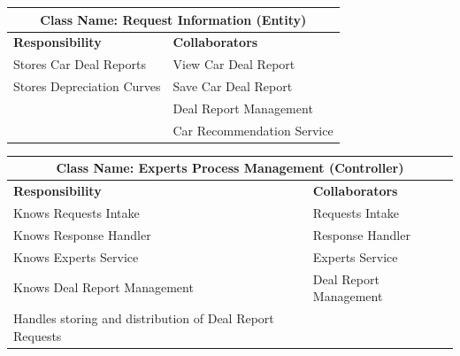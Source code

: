 \documentclass[]{article}
\begin{document}
\begin{table}[H]
  \centering
  \renewcommand{\arraystretch}{1.3} %
  \begin{tabular}{|p{7.5cm}|p{7.5cm}|}
    \hline
    \multicolumn{2}{|c|}{\textbf{Class Name: Request Information (Entity)}} \\
    \hline
    \textbf{Responsibility}    & \textbf{Collaborators}                     \\
    \hline
    Stores Car Deal Reports    & View Car Deal Report                       \\
    Stores Depreciation Curves & Save Car Deal Report                       \\
                               & Deal Report Management                     \\
                               & Car Recommendation Service                 \\
    \hline
  \end{tabular}
  \label{tab:crc_card}
\end{table}

\begin{table}[H]
  \centering
  \renewcommand{\arraystretch}{1.3} %
  \begin{tabular}{|p{7.5cm}|p{7.5cm}|}
    \hline
    \multicolumn{2}{|c|}{\textbf{Class Name: Experts Process Management (Controller)}} \\
    \hline
    \textbf{Responsibility}                                  & \textbf{Collaborators}  \\
    \hline
    Knows Requests Intake                                    & Requests Intake         \\
    Knows Response Handler                                   & Response Handler        \\
    Knows Experts Service                                    & Experts Service         \\
    Knows Deal Report Management                             & Deal Report Management  \\
    Handles storing and distribution of Deal Report Requests &                         \\
    \hline
  \end{tabular}
  \label{tab:crc_card}
\end{table}
\end{document}
